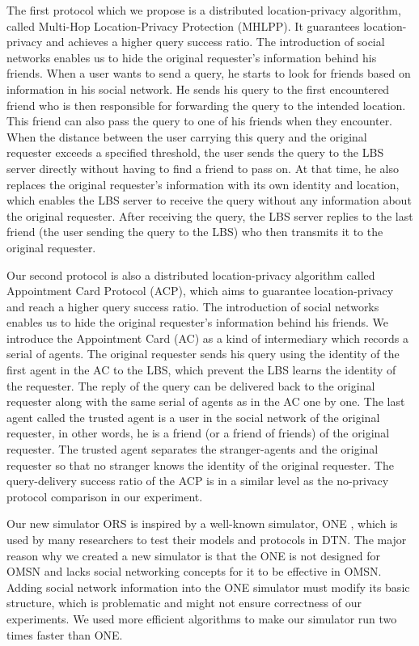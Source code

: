 The first protocol which we propose is a distributed location-privacy algorithm, called Multi-Hop Location-Privacy Protection (MHLPP). It guarantees location-privacy and achieves a higher query success ratio. The introduction of social networks enables us to hide the original requester's information behind his friends. When a user wants to send a query, he starts to look for friends based on information in his social network. He sends his query to the first encountered friend who is then responsible for forwarding the query to the intended location. This friend can also pass the query to one of his friends when they encounter. When the distance between the user carrying this query and the original requester exceeds a specified threshold, the user sends the query to the LBS server directly without having to find a friend to pass on. At that time, he also replaces the original requester's information with its own identity and location, which enables the LBS server to receive the query without any information about the original requester. After receiving the query, the LBS server replies to the last friend (the user sending the query to the LBS) who then transmits it to the original requester.

Our second protocol is also a distributed location-privacy algorithm called Appointment Card Protocol (ACP), which aims to guarantee location-privacy and reach a higher query success ratio. The introduction of social networks enables us to hide the original requester's information behind his friends. We introduce the Appointment Card (AC) as a kind of intermediary which records a serial of agents. The original requester sends his query using the identity of the first agent in the AC to the LBS, which prevent the LBS learns the identity of the requester. The reply of the query can be delivered back to the original requester along with the same serial of agents as in the AC one by one. The last agent called the trusted agent is a user in the social network of the original requester, in other words, he is a friend (or a friend of friends) of the original requester. The trusted agent separates the stranger-agents and the original requester so that no stranger knows the identity of the original requester. The query-delivery success ratio of the ACP is in a similar level as the no-privacy protocol comparison in our experiment.

Our new simulator ORS is inspired by a well-known simulator, ONE \cite {C35}, which is used by many researchers to test their models and protocols in DTN. The major reason why we created a new simulator is that the ONE is not designed for OMSN and lacks social networking concepts for it to be effective in OMSN. Adding social network information into the ONE simulator must modify its basic structure, which is problematic and might not ensure correctness of our experiments. We used more efficient algorithms to make our simulator run two times faster than ONE.


